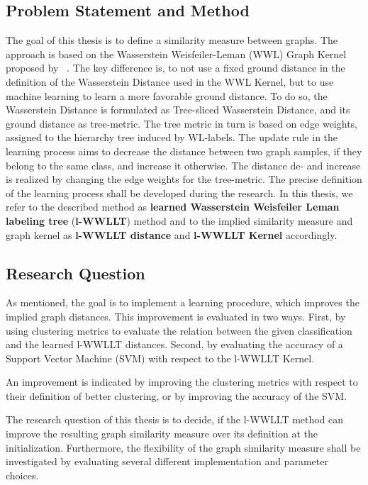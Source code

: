     \subsection{Problem Statement and Method} \label{subsec:problem_statement_method}    	    	
    	The goal of this thesis is to define a similarity measure between graphs.    	    	
    	The approach is based on the Wasserstein Weisfeiler-Leman (WWL) Graph Kernel proposed by \citeauthor{2019_Togninalli_NIPS}~\cite{2019_Togninalli_NIPS}.
    	The key difference is, to not use a fixed ground distance in the definition of the Wasserstein Distance used in the WWL Kernel, but to use machine learning to learn a more favorable ground distance.
    	To do so, the Wasserstein Distance is formulated as Tree-sliced Wasserstein Distance, and its ground distance as tree-metric.
    	The tree metric in turn is based on edge weights, assigned to the hierarchy tree induced by WL-labels.    	
    	The update rule in the learning process aims to decrease the distance between two graph samples, if they belong to the same class, and increase it otherwise.
    	The distance de- and increase is realized by changing the edge weights for the tree-metric.
    	The precise definition of the learning process shall be developed during the research.
    	In this thesis, we refer to the described method as \textbf{learned Wasserstein Weisfeiler Leman labeling tree} (\textbf{l-WWLLT}) method and to the implied similarity measure and graph kernel as \textbf{l-WWLLT distance} and \textbf{l-WWLLT Kernel} accordingly.
    	
	\subsection{Research Question} \label{subsec:research_question}
		As mentioned, the goal is to implement a learning procedure, which improves the implied graph distances.
		This improvement is evaluated in two ways.
		First, by using clustering metrics to evaluate the relation between the given classification and the learned l-WWLLT distances.
		Second, by evaluating the accuracy of a Support Vector Machine (SVM) with respect to the l-WWLLT Kernel.
		
		An improvement is indicated by improving the clustering metrics with respect to their definition of better clustering, or by improving the accuracy of the SVM.	
				
		The research question of this thesis is to decide, if the l-WWLLT method can improve the resulting graph similarity measure over its definition at the initialization.		
		Furthermore, the flexibility of the graph similarity measure shall be investigated by evaluating several different implementation and parameter choices.
			
